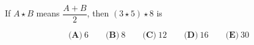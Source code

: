 If $ A \star B$ means $ \dfrac{A+B}{2}$, then $ (3 \star 5) \star 8$ is



\[ \textbf{(A)}\ 6 \qquad
\textbf{(B)}\ 8 \qquad
\textbf{(C)}\ 12 \qquad
\textbf{(D)}\ 16 \qquad
\textbf{(E)}\ 30
\]
